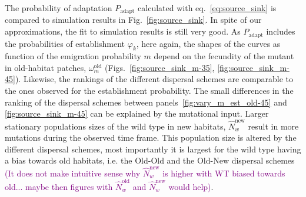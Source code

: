 \documentclass[11pt]{article}
\newcommand{\florence}[1]{\textcolor{purple}{(#1)}} %
\begin{document}
The probability of adaptation $P_{\mathrm{adapt}}$ calculated with eq.~\ref{eq:source_sink} is compared to simulation results in Fig.~\ref{fig:source_sink}. In spite of our approximations, the fit to simulation results is still very good. 
As $P_{\mathrm{adapt}}$ includes the probabilities of establishment $\varphi_{k}$, here again, the shapes of the curves as function of the emigration probability $m$ depend on the fecundity of the mutant in old-habitat patches, $\omega^\text{old}_m$ (Figs.~\ref{fig:source_sink_m-35}, \ref{fig:source_sink_m-45}). Likewise, the rankings of the different dispersal schemes are comparable to the ones observed for the establishment probability. The small differences in the ranking of the dispersal schemes between panels~\ref{fig:vary_m_est_old-45} and \ref{fig:source_sink_m-45} can be explained by the mutational input. Larger stationary populations sizes of the wild type in new habitats, $\widehat{N}_w^{\text{new}}$ result in more mutations during the observed time frame. This population size is altered by the different dispersal schemes, most importantly it is largest for the wild type having a bias towards old habitats, i.e. the Old-Old and the Old-New dispersal schemes \florence{It does not make intuitive sense why $\widehat{N}_w^{\text{new}}$ is higher with WT biased towards old... maybe then figures with $\widehat{N}_w^{\text{old}}$ and $\widehat{N}_w^{\text{new}}$ would help}. 
\end{document}
